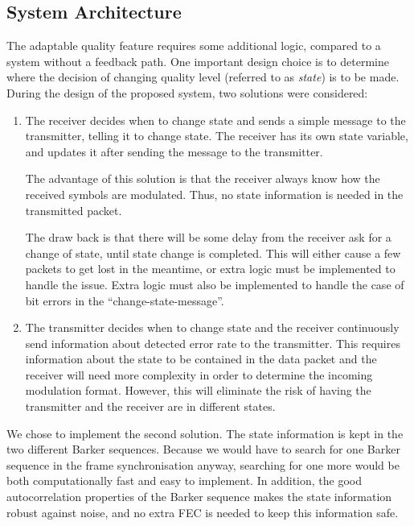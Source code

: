 
 
\subsection{System Architecture}
The adaptable quality feature requires some additional logic, compared to a system without a feedback path. One important design choice is to determine where the decision of changing quality level (referred to as \textit{state}) is to be made. During the design of the proposed system, two solutions were considered:
\begin{enumerate}
\item 
The receiver decides when to change state and sends a simple message to the transmitter, telling it to change state. The receiver has its own state variable, and updates it after sending the message to the transmitter.

The advantage of this solution is that the receiver always know how the received symbols are modulated. Thus, no state information is needed in the transmitted packet. 

The draw back is that there will be some delay from the receiver ask for a change of state, until state change is completed. This will either cause a few packets to get lost in the meantime, or extra logic must be implemented to handle the issue. Extra logic must also be implemented to handle the case of bit errors in the ``change-state-message''.

\item
The transmitter decides when to change state and the receiver continuously send information about detected error rate to the transmitter. This requires information about the state to be contained in the data packet and the receiver will need more complexity in order to determine the incoming modulation format. 
However, this will eliminate the risk of having the transmitter and the receiver are in different states. 
\end{enumerate}
We chose to implement the second solution. The state information is kept in the two different Barker sequences. Because we would have to search for one Barker sequence in the frame synchronisation anyway, searching for one more would be both computationally fast and easy to implement. In addition, the good autocorrelation properties of the Barker sequence makes the state information robust against noise, and no extra FEC is needed to keep this information safe. 

